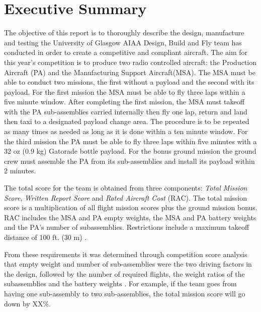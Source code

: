 \section{Executive Summary}

The objective of this report is to thoroughly describe the design, manufacture and testing the University of Glasgow AIAA Design, Build and Fly team has conducted in order to create a competitive and compliant aircraft. The aim for this year's competition is to produce two radio controlled aircraft: the Production Aircraft (PA) and the Manufacturing Support Aircraft(MSA). The MSA must be able to conduct two missions, the first without a payload and the second with its payload. For the first mission the MSA must be able to fly three laps within a five minute window. After completing the first mission, the MSA must takeoff with the PA sub-assemblies carried internally then fly one lap, return and land then taxi to a designated payload change area. The procedure is to be repeated as many times as needed as long as it is done within a ten minute window. For the third mission the PA must be able to fly three laps within five minutes with a 32 oz (0.9 \si{\kilo\gram}) Gatorade bottle payload. For the bonus ground mission the ground crew must assemble the PA from its sub-assemblies and install its payload within 2 minutes.

% 
%

The total score for the team is obtained from three components: \textit{Total Mission Score}, \textit{Written Report Score} and \textit{Rated Aircraft Cost} (RAC). The total mission score is a multiplication of all flight mission scores plus the ground mission bonus. RAC includes the MSA and PA empty weights, the MSA and PA battery weights and the PA's number of subassemblies. Restrictions include a maximum takeoff distance of 100 ft. (30 \si{\meter}) .


From these requirements it was determined through competition score analysis that empty weight and number of sub-assemblies were the two driving factors in the design, followed by the number of required flights, the weight ratios of the subassemblies and the battery weights . For example, if the team goes from having one sub-assembly to two sub-assemblies, the total mission score will go down by XX\%.

